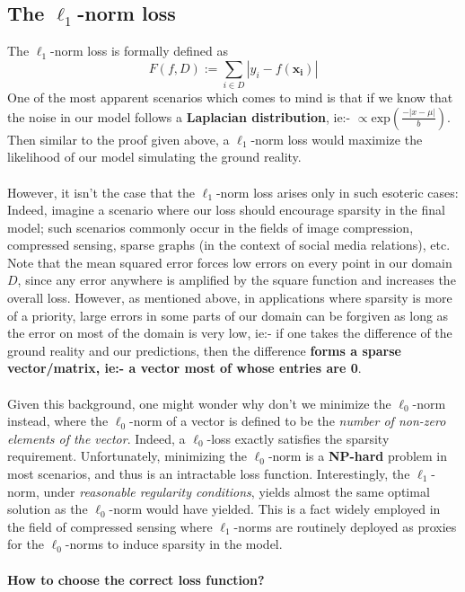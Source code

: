 \documentclass[12pt]{article}
\begin{document}
\subsection*{The $\ell_1$-norm loss}

The $\ell_1$-norm loss is formally defined as 
$$F(f, D) := \sum_{i\in D}|y_i - f(\boldsymbol{x_i})|$$
One of the most apparent scenarios which comes to mind is that if we know that the noise in our model follows a \textbf{Laplacian distribution}, ie:- $\propto \mathrm{exp}\left(\frac{-|x-\mu|}{b}\right)$. Then similar to the proof given above, a $\ell_1$-norm loss would maximize the likelihood of our model simulating the ground reality.\\ \\
However, it isn't the case that the $\ell_1$-norm loss arises only in such esoteric cases: Indeed, imagine a scenario where our loss should encourage sparsity in the final model; such scenarios commonly occur in the fields of image compression, compressed sensing, sparse graphs (in the context of social media relations), etc. Note that the mean squared error forces low errors on every point in our domain $D$, since any error anywhere is amplified by the square function and increases the overall loss. However, as mentioned above, in applications where sparsity is more of a priority, large errors in some parts of our domain can be forgiven as long as the error on most of the domain is very low, ie:- if one takes the difference of the ground reality and our predictions, then the difference \textbf{forms a sparse vector/matrix, ie:- a vector most of whose entries are 0}. \\ \\
Given this background, one might wonder why don't we minimize the $\ell_0$-norm instead, where the $\ell_0$-norm of a vector is defined to be the \emph{number of non-zero elements of the vector}. Indeed, a $\ell_0$-loss exactly satisfies the sparsity requirement. Unfortunately, minimizing the $\ell_0$-norm is a \textbf{NP-hard} problem in most scenarios, and thus is an intractable loss function. Interestingly, the $\ell_1$-norm, under \emph{reasonable regularity conditions}, yields almost the same optimal solution as the $\ell_0$-norm would have yielded. This is a fact widely employed in the field of compressed sensing where $\ell_1$-norms are routinely deployed as proxies for the $\ell_0$-norms to induce sparsity in the model.
 \\ \\
\noindent \textbf{ How to choose the correct loss function? }
\end{document}
